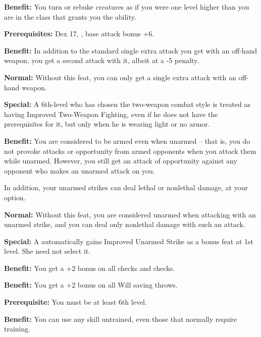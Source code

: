 \textbf{Benefit:} You turn or rebuke creatures as if you were one level higher 
than you are in the class that grants you the ability.


\textbf{Prerequisites:} Dex 17, , base attack bonus +6.

\textbf{Benefit:} In addition to the standard single extra attack you get with 
an off-hand weapon, you get a second attack with it, albeit at a -5 penalty.

\textbf{Normal:} Without this feat, you can only get a single extra attack with 
an off-hand weapon.

\textbf{Special:} A 6th-level  who has chosen the two-weapon combat style is treated as having 
Improved Two-Weapon Fighting, even if he does not have the prerequisites for it, 
but only when he is wearing light or no armor.


\textbf{Benefit:} You are considered to be armed even when unarmed  -- that is, 
you do not provoke attacks or opportunity from armed opponents when you attack 
them while unarmed. However, you still get an attack of opportunity against any 
opponent who makes an unarmed attack on you.

In addition, your unarmed strikes can deal lethal or nonlethal damage, at your 
option.

\textbf{Normal:} Without this feat, you are considered unarmed when attacking with 
an unarmed strike, and you can deal only nonlethal damage with such an attack.

\textbf{Special:} A  automatically gains Improved Unarmed Strike as a bonus 
feat at 1st level. She need not select it.


\textbf{Benefit:} You get a +2 bonus on all  checks and  
checks.


\textbf{Benefit:} You get a +2 bonus on all Will saving throws.


\textbf{Prerequisite:} You must be at least 6th level.

\textbf{Benefit:} You can use any skill untrained, even those that normally require 
training.

